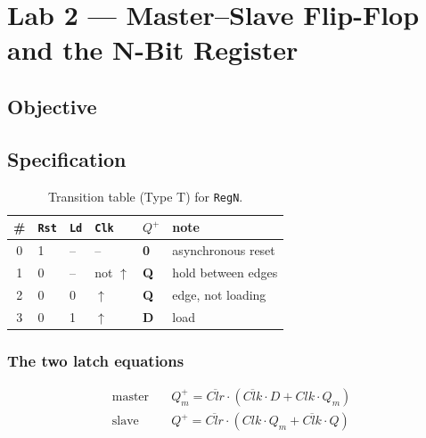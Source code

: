
\chapter{Lab 2 --- Master--Slave Flip-Flop and the N-Bit Register}

\section{Objective}

\section{Specification}

\begin{table}[htbp]
\centering
\caption{Transition table (Type T) for \texttt{RegN}.}
\label{tab:lab02-truth}
\begin{tabular}{clll||ll}
\toprule
\# & \texttt{Rst} & \texttt{Ld} & \texttt{Clk} & $Q^{+}$ & note \\
\midrule
0 & 1 & -- & -- & \textbf{0} & asynchronous reset \\
1 & 0 & -- & not $\uparrow$ & \textbf{Q} & hold between edges \\
2 & 0 & 0 & $\uparrow$ & \textbf{Q} & edge, not loading \\
3 & 0 & 1 & $\uparrow$ & \textbf{D} & load \\
\bottomrule
\end{tabular}
\end{table}

\subsection*{The two latch equations}

\begin{align*}
\text{master} \quad & Q_m^{+} = \overline{Clr}\cdot\left( \overline{Clk}\cdot D + Clk\cdot Q_m \right)\\
\text{slave}  \quad & Q^{+}   = \overline{Clr}\cdot\left( Clk\cdot Q_m + \overline{Clk}\cdot Q \right)
\end{align*}


